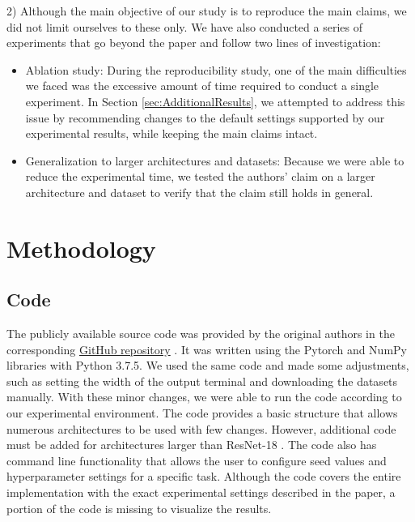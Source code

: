 2) Although the main objective of our study is to reproduce the main claims, we did not limit ourselves to these only. We have also conducted a series of experiments that go beyond the paper and follow two lines of investigation:
\begin{itemize}
    \item Ablation study: During the reproducibility study, one of the main difficulties we faced was the excessive amount of time required to conduct a single experiment. In Section \ref{sec:AdditionalResults}, we attempted to address this issue by recommending changes to the default settings supported by our experimental results, while keeping the main claims intact.
    \item Generalization to larger architectures and datasets: Because we were able to reduce the experimental time, we tested the authors' claim on a larger architecture and dataset to verify that the claim still holds in general.
\end{itemize}


\section{Methodology}
\label{sec:Methodology}
\subsection{Code}
The publicly available source code was provided by the original authors in the corresponding \href{https://github.com/ceciliaresearch/nondeterminism_instability}{GitHub repository} . It was written using the Pytorch \cite{paszke2019pytorch} and NumPy libraries with Python 3.7.5. We used the same code and made some adjustments, such as setting the width of the output terminal and downloading the datasets manually. With these minor changes, we were able to run the code according to our experimental environment. The code provides a basic structure that allows numerous architectures to be used with few changes. However, additional code must be added for architectures larger than ResNet-18 \cite{he2016deep}. The code also has command line functionality that allows the user to configure seed values and hyperparameter settings for a specific task. Although the code covers the entire implementation with the exact experimental settings described in the paper, a portion of the code is missing to visualize the results.
